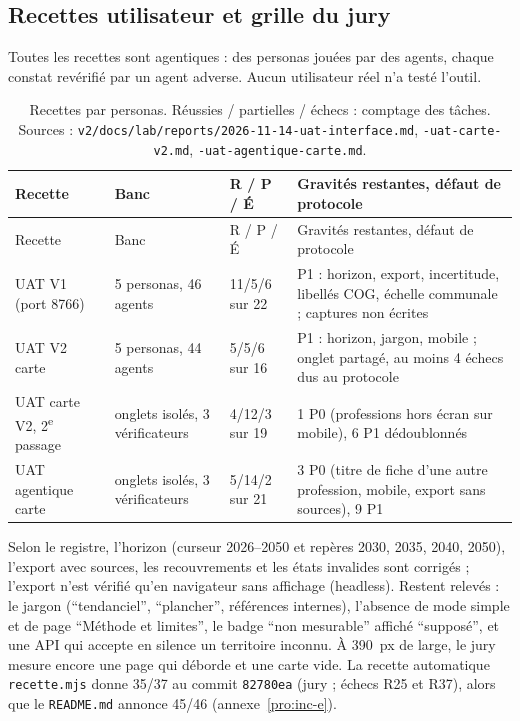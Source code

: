 \subsection{Recettes utilisateur et grille du jury}\label{pro:recettes}

Toutes les recettes sont agentiques : des personas jouées par des agents, chaque constat revérifié par un agent adverse. Aucun utilisateur réel n'a testé l'outil.

\begin{small}
\begin{longtable}{@{}p{}p{}p{}p{}@{}}
\caption{Recettes par personas. Réussies / partielles / échecs : comptage des tâches. Sources : \texttt{v2/\allowbreak{}docs/\allowbreak{}lab/\allowbreak{}reports/\allowbreak{}2026-\allowbreak{}11-\allowbreak{}14-\allowbreak{}uat-\allowbreak{}interface.md}, \texttt{-\allowbreak{}uat-\allowbreak{}carte-\allowbreak{}v2.md}, \texttt{-\allowbreak{}uat-\allowbreak{}agentique-\allowbreak{}carte.md}.}\label{pro:tab-uat}\\
\toprule Recette & Banc & R / P / É & Gravités restantes, défaut de protocole \\ \midrule\endfirsthead
\toprule Recette & Banc & R / P / É & Gravités restantes, défaut de protocole \\ \midrule\endhead
\bottomrule\endfoot
UAT V1 (port 8766) & 5\mesure{} personas, 46\mesure{} agents & 11/5/6\mesure{} sur 22 & P1 : horizon, export, incertitude, libellés COG, échelle communale ; captures non écrites \\
UAT V2 carte & 5\mesure{} personas, 44\mesure{} agents & 5/5/6\mesure{} sur 16 & P1 : horizon, jargon, mobile ; onglet partagé, au moins 4\mesure{} échecs dus au protocole \\
UAT carte V2, 2\textsuperscript{e} passage & onglets isolés, 3\mesure{} vérificateurs & 4/12/3\mesure{} sur 19 & 1\mesure{} P0 (professions hors écran sur mobile), 6\mesure{} P1 dédoublonnés \\
UAT agentique carte & onglets isolés, 3\mesure{} vérificateurs & 5/14/2\mesure{} sur 21 & 3\mesure{} P0 (titre de fiche d'une autre profession, mobile, export sans sources), 9\mesure{} P1 \\
\end{longtable}
\end{small}

Selon le registre, l'horizon (curseur 2026--2050 et repères 2030, 2035, 2040, 2050), l'export avec sources, les recouvrements et les états invalides sont corrigés ; l'export n'est vérifié qu'en navigateur sans affichage (headless).
Restent relevés : le jargon (\enquote{tendanciel}, \enquote{plancher}, références internes), l'absence de mode simple et de page \enquote{Méthode et limites}, le badge \enquote{non mesurable} affiché \enquote{supposé}, et une API qui accepte en silence un territoire inconnu. À 390\mesure{}~px de large, le jury mesure encore une page qui déborde et une carte vide.
La recette automatique \texttt{recette.mjs} donne 35/37\mesure{} au commit \texttt{82780ea} (jury ; échecs R25 et R37), alors que le \texttt{README.md} annonce 45/46 (annexe~\ref{pro:inc-e}).

